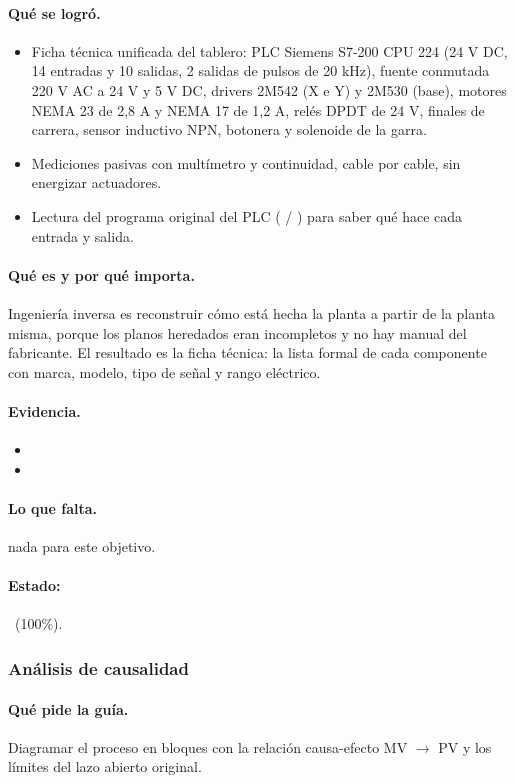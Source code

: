\documentclass[a4paper,11pt]{article}
\begin{document}
\paragraph{Qué se logró.}
\begin{itemize}
\item Ficha técnica unificada del tablero: PLC Siemens S7-200 CPU 224 (24 V DC, 14 entradas y 10 salidas, 2 salidas de pulsos de 20 kHz), fuente conmutada 220 V AC a 24 V y 5 V DC, drivers 2M542 (X e Y) y 2M530 (base), motores NEMA 23 de 2,8 A y NEMA 17 de 1,2 A, relés DPDT de 24 V, finales de carrera, sensor inductivo NPN, botonera y solenoide de la garra.
\item Mediciones pasivas con multímetro y continuidad, cable por cable, sin energizar actuadores.
\item Lectura del programa original del PLC ( / ) para saber qué hace cada entrada y salida.
\end{itemize}
\paragraph{Qué es y por qué importa.} Ingeniería inversa es reconstruir cómo está hecha la planta a partir de la planta misma, porque los planos heredados eran incompletos y no hay manual del fabricante. El resultado es la ficha técnica: la lista formal de cada componente con marca, modelo, tipo de señal y rango eléctrico.
\paragraph{Evidencia.}
\begin{itemize}\small
\item {}
\item {}
\end{itemize}
\paragraph{Lo que falta.} nada para este objetivo.
\paragraph{Estado:} \cumple~(100\%).
\subsubsection{Análisis de causalidad}
\paragraph{Qué pide la guía.} Diagramar el proceso en bloques con la relación causa-efecto MV $\to$ PV y los límites del lazo abierto original.
\end{document}
